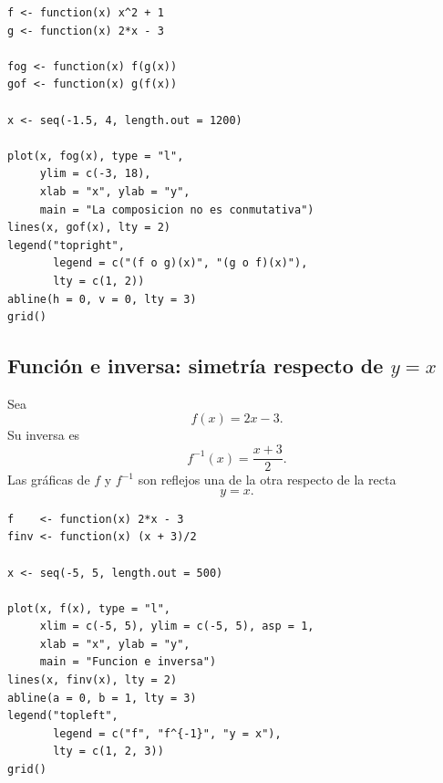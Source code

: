 \documentclass[12pt]{article}
\theoremstyle{remark}
\begin{document}
\begin{verbatim}
f <- function(x) x^2 + 1
g <- function(x) 2*x - 3

fog <- function(x) f(g(x))
gof <- function(x) g(f(x))

x <- seq(-1.5, 4, length.out = 1200)

plot(x, fog(x), type = "l",
     ylim = c(-3, 18),
     xlab = "x", ylab = "y",
     main = "La composicion no es conmutativa")
lines(x, gof(x), lty = 2)
legend("topright",
       legend = c("(f o g)(x)", "(g o f)(x)"),
       lty = c(1, 2))
abline(h = 0, v = 0, lty = 3)
grid()
\end{verbatim}

\subsection{Función e inversa: simetría respecto de $y=x$}

Sea
\[
f(x)=2x-3.
\]
Su inversa es
\[
f^{-1}(x)=\frac{x+3}{2}.
\]
Las gráficas de $f$ y $f^{-1}$ son reflejos una de la otra respecto de la
recta
\[
y=x.
\]

\begin{center}
\end{center}

\begin{verbatim}
f    <- function(x) 2*x - 3
finv <- function(x) (x + 3)/2

x <- seq(-5, 5, length.out = 500)

plot(x, f(x), type = "l",
     xlim = c(-5, 5), ylim = c(-5, 5), asp = 1,
     xlab = "x", ylab = "y",
     main = "Funcion e inversa")
lines(x, finv(x), lty = 2)
abline(a = 0, b = 1, lty = 3)
legend("topleft",
       legend = c("f", "f^{-1}", "y = x"),
       lty = c(1, 2, 3))
grid()
\end{verbatim}

\end{document}

